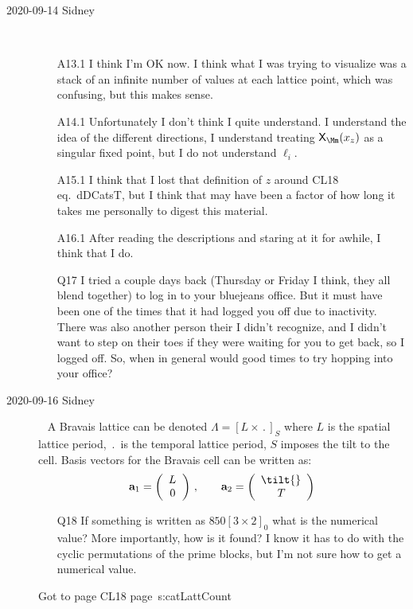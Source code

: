 \begin{description}
\item[2020-09-14 Sidney]~~
\begin{itemize}
	\item[A13.1]
I think I'm OK now. I think what I was trying to visualize was a stack of an infinite number of values at each lattice point, which was confusing, but this makes sense.
	\item[A14.1]
Unfortunately I don't think I quite understand. I understand the idea of the different directions, I understand treating
$\Xx_\Mm(\ssp_z)$ as a singular fixed point, but I do not understand $\ell_i$.
	\item[A15.1]
I think that I lost that definition of $\textit{z}$ around CL18 eq.~{dDCatsT}, but I think that may have been a factor of how long it takes me personally to digest this material.
	\item[A16.1]
After reading the descriptions and staring at it for awhile, I think that I do.
	\item[Q17]
I tried a couple days back (Thursday or Friday I think, they all blend together) to log in to your bluejeans office. But it must have been one of the times that it had logged you off due to inactivity. There was also another person their I didn't recognize, and I didn't want to step on their toes if they were waiting for you to get back, so I logged off. So, when in general would good times to try hopping into your office?
\end{itemize}

\item[2020-09-16 Sidney]~
A Bravais lattice can be denoted $\Lambda=\left[L\times\period{}\right]_S$ where $L$
is the spatial lattice period,  $\period{}$ is the temporal lattice period, $S$
imposes the tilt to the cell. Basis vectors for the Bravais cell can be
written as:
\[
\mathbf{a}_1=\left(\begin{array}{c}
  \speriod{}\\
  0{}
  \end{array}\right)
  \,,\qquad
\mathbf{a}_2=\left(\begin{array}{c}
  \tilt{}\\
  \period{}
  \end{array}\right)
  \,
\]

\begin{itemize}
	\item[Q18]
If something is written as $850[3\times2]_0$ what is the numerical value?
More importantly, how is it found? I know it has to do with the cyclic
permutations of the prime blocks, but I'm not sure how to get a numerical
value.
\end{itemize}
Got to page CL18 page~{s:catLattCount}


\end{description}
